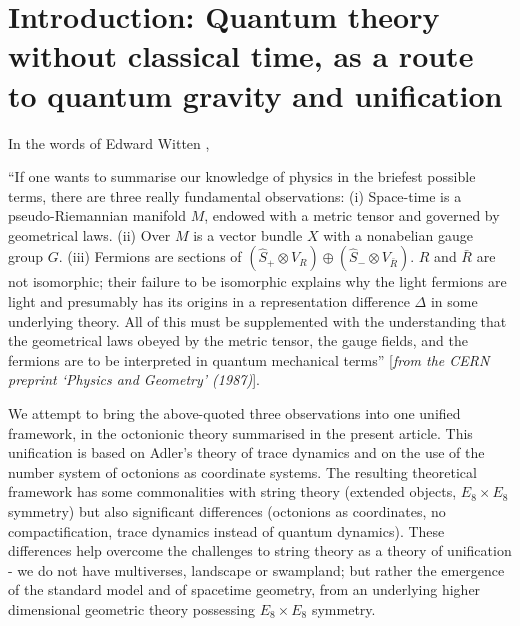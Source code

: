 \documentclass[a4paper]{jpconf}
\begin{document}
\section{Introduction: Quantum theory without classical time, as a route to quantum gravity and unification}

\smallskip

In the words of Edward Witten \cite{Witten1986},

\smallskip

\noindent ``If one wants to summarise our knowledge of physics in the briefest possible terms, there are three really fundamental observations: (i) Space-time is a pseudo-Riemannian manifold $M$, endowed with a metric tensor and governed by geometrical laws. (ii) Over $M$ is a vector bundle $X$ with a nonabelian gauge group $G$. (iii) Fermions are sections of $(\hat{S}_{+} \otimes V_R)\oplus(\hat{S}_{-}\otimes V_{\bar{R}})$. $R$ and $\bar{R}$ are not isomorphic; their failure to be isomorphic explains why the light fermions are light and presumably has its origins in a representation difference $\Delta$ in some underlying theory. All of this must be supplemented with the understanding that the geometrical laws obeyed by the metric tensor, the gauge fields, and the fermions are to be interpreted in quantum mechanical terms''  [{\it from the CERN preprint `Physics and Geometry' (1987)}]. 

We attempt to bring the above-quoted three observations into one unified framework, in the octonionic theory \cite{SinghTD, Singh2021} summarised in the present article. This unification is based on Adler's theory of trace dynamics \cite{Adler04} and on the use of the number system of octonions as coordinate systems. The resulting theoretical framework has some commonalities with string theory (extended objects, $E_8\times E_8$ symmetry) but also significant differences (octonions as coordinates, no compactification, trace dynamics instead of quantum dynamics). These differences help overcome the challenges to  string theory as a theory of unification - we do not have multiverses, landscape or swampland; but rather the  emergence of the standard model and of spacetime geometry, from an underlying higher dimensional geometric theory possessing $E_8 \times E_8$ symmetry.
\end{document}
